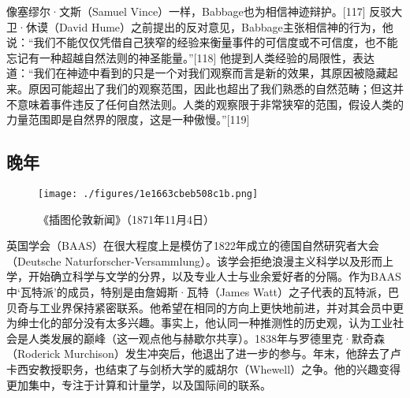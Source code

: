 像塞缪尔·文斯（Samuel Vince）一样，Babbage也为相信神迹辩护。[117] 反驳大卫·休谟（David Hume）之前提出的反对意见，Babbage主张相信神的行为，他说：“我们不能仅仅凭借自己狭窄的经验来衡量事件的可信度或不可信度，也不能忘记有一种超越自然法则的神圣能量。”[118] 他提到人类经验的局限性，表达道：“我们在神迹中看到的只是一个对我们观察而言是新的效果，其原因被隐藏起来。原因可能超出了我们的观察范围，因此也超出了我们熟悉的自然范畴；但这并不意味着事件违反了任何自然法则。人类的观察限于非常狭窄的范围，假设人类的力量范围即是自然界的限度，这是一种傲慢。”[119]
\subsection{晚年}
\begin{figure}[ht]
\centering
\texttt{[image: ./figures/1e1663cbeb508c1b.png]}
\caption{《插图伦敦新闻》（1871年11月4日）} \label{fig_CRSBQ_2}
\end{figure}
英国学会（BAAS）在很大程度上是模仿了1822年成立的德国自然研究者大会（Deutsche Naturforscher-Versammlung）。该学会拒绝浪漫主义科学以及形而上学，开始确立科学与文学的分界，以及专业人士与业余爱好者的分隔。作为BAAS中‘瓦特派’的成员，特别是由詹姆斯·瓦特（James Watt）之子代表的瓦特派，巴贝奇与工业界保持紧密联系。他希望在相同的方向上更快地前进，并对其会员中更为绅士化的部分没有太多兴趣。事实上，他认同一种推测性的历史观，认为工业社会是人类发展的巅峰（这一观点他与赫歇尔共享）。1838年与罗德里克·默奇森（Roderick Murchison）发生冲突后，他退出了进一步的参与。年末，他辞去了卢卡西安教授职务，也结束了与剑桥大学的威胡尔（Whewell）之争。他的兴趣变得更加集中，专注于计算和计量学，以及国际间的联系。